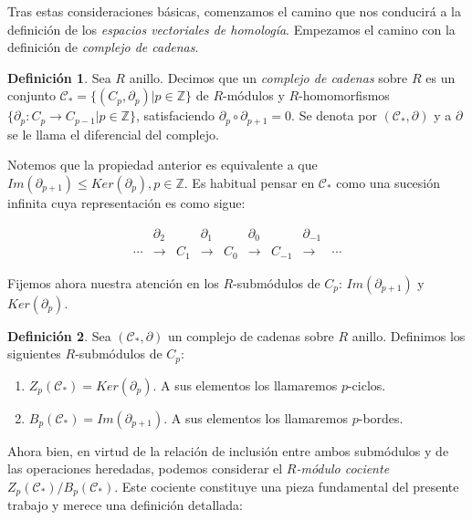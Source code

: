 \documentclass[12pt, a4paper, twoside]{book}
\numberwithin{equation}{section}
\theoremstyle{definition}
\newtheorem{defi}{Definición}
\theoremstyle{remark}
\theoremstyle{plain}
\begin{document}
	Tras estas consideraciones básicas, comenzamos el camino que nos 
	conducirá a la definición de los \emph{espacios vectoriales de 
	homología}. Empezamos el camino con la definición de \emph{complejo de 
	cadenas}.

	\begin{defi}
	Sea $R$ anillo. Decimos que un \textit{complejo de cadenas} sobre $R$ 
	es un conjunto $\mathcal{C}_{*}=\{(C_{p},\partial_{p}) | p \in \mathbb{Z}\}$
	de $R$-módulos y $R$-homomorfismos $\{\partial_{p}: C_{p} \rightarrow 
	C_{p-1} | p \in \mathbb{Z}\}$, satisfaciendo $\partial_{p}\circ 
	\partial_{p+1}=0$. Se denota por $(\mathcal{C}_{*},\partial)$ y a 
	$\partial$ se le llama el diferencial del complejo.
	\end{defi}

	Notemos que la propiedad anterior es equivalente a que 
	$Im(\partial_{p+1}) \leq Ker(\partial_{p}), p \in \mathbb{Z}$. Es 
	habitual pensar en $\mathcal{C}_{*}$ como una sucesión infinita cuya
	representación es como sigue:

	\begin{equation*}
		 \left.
		\begin{array}{ccccccccc}
			 & \partial_{2} &  & \partial_{1} &  & 
			\partial_{0} &  & \partial_{-1} & \\ 
			\cdots & \longrightarrow & C_{1}& 
			\longrightarrow & C_{0} 
					& \longrightarrow 
			& C_{-1} & 
			\longrightarrow & \cdots 
		\end{array}
		\right. 
	\end{equation*}

	Fijemos ahora nuestra atención en los $R$-submódulos de $C_{p}$: 
	$Im(\partial_{p+1})$ y $Ker(\partial_{p})$.

	\begin{defi}
		Sea $(\mathcal{C}_{*},\partial)$ un complejo de cadenas sobre 
		$R$ anillo. 
		Definimos los siguientes $R$-submódulos de $C_{p}$:
		\begin{enumerate}
			\item $Z_{p}(\mathcal{C}_{*})=Ker(\partial_{p})$. A 
				sus elementos los llamaremos $p$-ciclos.
			\item $B_{p}(\mathcal{C}_{*})=Im(\partial_{p+1})$. A 
				sus elementos los llamaremos $p$-bordes.
		\end{enumerate}
	\end{defi}

	Ahora bien, en virtud de la relación de inclusión entre ambos 
	submódulos y de las operaciones heredadas, podemos considerar el 
	\emph{$R$-módulo cociente} $Z_{p}(\mathcal{C}_{*})/B_{p}(
	\mathcal{C}_{*})$. Este cociente constituye una pieza fundamental del 
	presente trabajo y merece una definición detallada:
\end{document}
